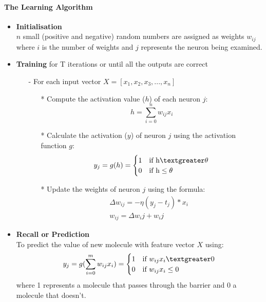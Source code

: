 \documentclass[a4paper,12pt]{report}
\begin{document}
				\begin{mdframed}[]
					\paragraph{The Learning Algorithm \cite{StephenM2014}}
					\begin{itemize}
						\item \textbf{Initialisation}
						\\ $n$ small (positive and negative) random numbers are assigned as weights $w_{ij}$ where $i$ is the number of weights and $j$ represents the neuron being examined.
						\item \textbf{Training} for T iterations or until all the outputs are correct
						\begin{itemize}
							\item[-] For each input vector $X = [x_1,x_2,x_3,...,x_n]$
							\begin{itemize}
								\item[*] Compute the activation value ($h$) of each neuron $j$: \\
								\begin{equation}
								h = \sum_{i=0}^{n}w_{ij}x_i
								\end{equation}
								\item[*] Calculate the activation ($y$) of neuron $j$ using the activation function $g$: \\
								\begin{equation}
								y_j = g(h) = 
								\begin{cases}
								1 & \text{if h} \textgreater \theta \\
								0 & \text{if h} \le \theta
								\end{cases}
								\end{equation}
								\item[*] Update the weights of neuron $j$ using the formula: \\
								\begin{eqnarray}
								\Delta w_{ij} = - \eta(y_j - t_j) * x_i & \\
								w_{ij} = \Delta w_ij + w_ij
								\end{eqnarray}
								
							\end{itemize}
						\end{itemize}
						\item \textbf{Recall or Prediction}	
						\\To predict the value of new molecule with feature vector $X$ using:
						\begin{equation}
						y_j = g(\sum_{i=0}^{m}w_{ij}x_i) = 
						\begin{cases}
						1 & \text{if } w_{ij}x_i \textgreater 0 \\
						0 & \text{if } w_{ij}x_i \le 0
						\end{cases}
						\end{equation}
						where 1 represents a molecule that passes through the barrier and 0 a molecule that doesn't.
					\end{itemize}
				\end{mdframed}
\end{document}
